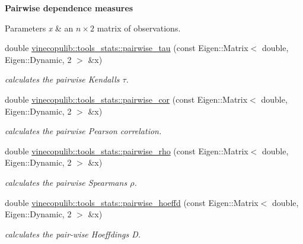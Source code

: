 \begin{Indent}{\bf Pairwise dependence measures}\par
{\em 
\begin{DoxyParams}{Parameters}
{\em x} & an $ n \times 2 $ matrix of observations. \\
\hline
\end{DoxyParams}
}\begin{DoxyCompactItemize}
\item 
double \hyperlink{namespacevinecopulib_1_1tools__stats_a8530da1bb8eb0f8a25eb86b6574bed02}{vinecopulib\+::tools\+\_\+stats\+::pairwise\+\_\+tau} (const Eigen\+::\+Matrix$<$ double, Eigen\+::\+Dynamic, 2 $>$ \&x)\hypertarget{namespacevinecopulib_1_1tools__stats_a8530da1bb8eb0f8a25eb86b6574bed02}{}\label{namespacevinecopulib_1_1tools__stats_a8530da1bb8eb0f8a25eb86b6574bed02}

\begin{DoxyCompactList}\small\item\em calculates the pairwise Kendall\textquotesingle{}s $ \tau $. \end{DoxyCompactList}\item 
double \hyperlink{namespacevinecopulib_1_1tools__stats_ad076513f9a531a015bb0eaff098a8271}{vinecopulib\+::tools\+\_\+stats\+::pairwise\+\_\+cor} (const Eigen\+::\+Matrix$<$ double, Eigen\+::\+Dynamic, 2 $>$ \&x)\hypertarget{namespacevinecopulib_1_1tools__stats_ad076513f9a531a015bb0eaff098a8271}{}\label{namespacevinecopulib_1_1tools__stats_ad076513f9a531a015bb0eaff098a8271}

\begin{DoxyCompactList}\small\item\em calculates the pairwise Pearson correlation. \end{DoxyCompactList}\item 
double \hyperlink{namespacevinecopulib_1_1tools__stats_aa5cb9d201eef90b94024e5d354ac8174}{vinecopulib\+::tools\+\_\+stats\+::pairwise\+\_\+rho} (const Eigen\+::\+Matrix$<$ double, Eigen\+::\+Dynamic, 2 $>$ \&x)\hypertarget{namespacevinecopulib_1_1tools__stats_aa5cb9d201eef90b94024e5d354ac8174}{}\label{namespacevinecopulib_1_1tools__stats_aa5cb9d201eef90b94024e5d354ac8174}

\begin{DoxyCompactList}\small\item\em calculates the pairwise Spearman\textquotesingle{}s $ \rho $. \end{DoxyCompactList}\item 
double \hyperlink{namespacevinecopulib_1_1tools__stats_a2dae5e063461728f92eae5e6e346fdd3}{vinecopulib\+::tools\+\_\+stats\+::pairwise\+\_\+hoeffd} (const Eigen\+::\+Matrix$<$ double, Eigen\+::\+Dynamic, 2 $>$ \&x)\hypertarget{namespacevinecopulib_1_1tools__stats_a2dae5e063461728f92eae5e6e346fdd3}{}\label{namespacevinecopulib_1_1tools__stats_a2dae5e063461728f92eae5e6e346fdd3}

\begin{DoxyCompactList}\small\item\em calculates the pair-\/wise Hoeffding\textquotesingle{}s D. \end{DoxyCompactList}\end{DoxyCompactItemize}
\end{Indent}
